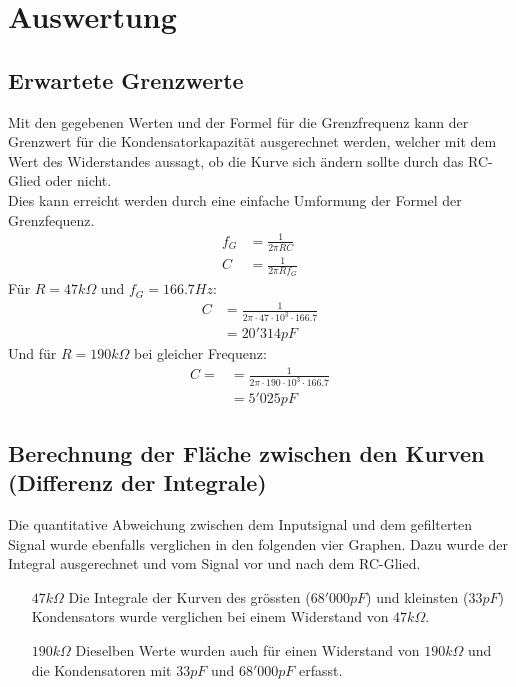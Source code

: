 \documentclass{article}
\begin{document}
\section{Auswertung}


\subsection{Erwartete Grenzwerte}

Mit den gegebenen Werten und der Formel für die Grenzfrequenz kann der Grenzwert für die Kondensatorkapazität ausgerechnet werden, welcher mit dem Wert des Widerstandes aussagt, ob die Kurve sich ändern sollte durch das RC-Glied oder nicht.
\\

Dies kann erreicht werden durch eine einfache Umformung der Formel der Grenzfequenz.
\begin{align}
    f_G &= \frac{1}{2\pi RC}    \\
    C   &= \frac{1}{2\pi R f_G}
\end{align}
Für $R = 47k\Omega$ und $f_G = 166.7Hz$:
\begin{align}
    C &= \frac{1}{2\pi \cdot 47 \cdot 10^3 \cdot 166.7} \\
      &= 20'314pF
\end{align}
Und für $R = 190k\Omega$ bei gleicher Frequenz:
\begin{align}
    C = &= \frac{1}{2\pi \cdot 190 \cdot 10^3 \cdot 166.7}  \\
        &= 5'025pF
\end{align}


\subsection{Berechnung der Fläche zwischen den Kurven (Differenz der Integrale)}

Die quantitative Abweichung zwischen dem Inputsignal und dem gefilterten Signal wurde ebenfalls verglichen in den folgenden vier Graphen. Dazu wurde der Integral ausgerechnet und vom Signal vor und nach dem RC-Glied.

\begin{itemize}
    \item[$47k\Omega$] Die Integrale der Kurven des grössten ($68'000pF$) und kleinsten ($33pF$) Kondensators wurde verglichen bei einem Widerstand von $47k\Omega$.
    \item[$190k\Omega$] Dieselben Werte wurden auch für einen Widerstand von $190k\Omega$ und die Kondensatoren mit $33pF$ und $68'000pF$ erfasst.
\end{itemize}
\end{document}
